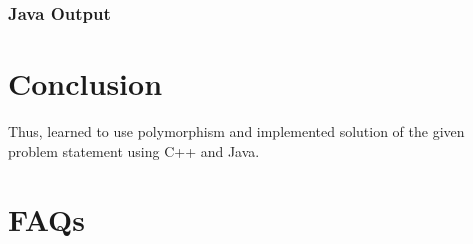 \documentclass[11pt]{article}
\begin{document}

\subsubsection{Java Output}



\section{Conclusion}
Thus, learned to use polymorphism and implemented solution of the given problem statement using C++ and Java.
\pagebreak

\section{FAQs}
\end{document}

